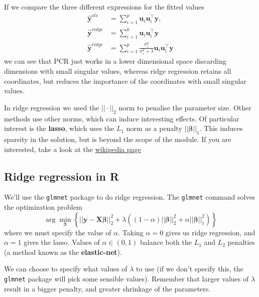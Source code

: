 \documentclass[
]{book}
\theoremstyle{definition}
\theoremstyle{definition}
\theoremstyle{definition}
\theoremstyle{definition}
\theoremstyle{remark}
\begin{document}
If we compare the three different expressions for the fitted values
\begin{align*}
\hat{\mathbf y}^{ols}&=\sum_{i=1}^p \mathbf u_i \mathbf u_i^\top \mathbf y,\\
\hat{\mathbf y}^{ridge}&=\sum_{i=1}^k \mathbf u_i \mathbf u_i^\top \mathbf y\\
\hat{\mathbf y}^{ridge}&=\sum_{i=1}^p \frac{\sigma^2_i}{\sigma^2_i+\lambda} \mathbf u_i \mathbf u_i^\top \mathbf y
\end{align*}
we can see that PCR just works in a lower dimensional space discarding dimensions with small singular values, whereas ridge regression retains all coordinates, but reduces the importance of the coordinates with small singular values.

In ridge regression we used the \(||\cdot||_2\) norm to penalise the parameter size. Other methods use other norms, which can induce interesting effects. Of particular interest is the \textbf{lasso}, which uses the \(L_1\) norm as a penalty \(||\boldsymbol \beta||_1\). This induces sparsity in the solution, but is beyond the scope of the module. If you are interested, take a look at the \href{https://en.wikipedia.org/wiki/Lasso_(statistics)}{wikipedia page}

\hypertarget{ridge-regression-in-r}{%
\subsection{Ridge regression in R}\label{ridge-regression-in-r}}

We'll use the \texttt{glmnet} package to do ridge regression. The \texttt{glmnet} command solves the optimization problem
\[\arg \min_{\boldsymbol \beta} \left\{||\mathbf y- \mathbf X\boldsymbol \beta||^2_2+\lambda \left((1-\alpha)||\boldsymbol \beta||_2^2+\alpha ||\boldsymbol \beta||_1^2\right)\right\}\]
where we must specify the value of \(\alpha\).
Taking \(\alpha=0\) gives us ridge regression, and \(\alpha=1\) gives the lasso. Values of \(\alpha \in (0,1)\) balance both the \(L_1\) and \(L_2\) penalties (a method known as the \textbf{elastic-net}).

We can choose to specify what values of \(\lambda\) to use (if we don't specify this, the \texttt{glmnet} package will pick some sensible values). Remember that larger values of \(\lambda\) result in a bigger penalty, and greater shrinkage of the parameters.
\end{document}
